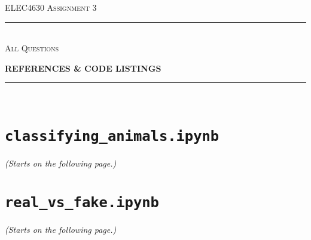 \begin{titlepage}
  \centering

  \textsc{ELEC4630 Assignment 3}\\
  \vspace{9cm}

  \rule{\linewidth}{0.5pt}\\

  \vspace{1em}
  \LARGE\textsc{All Questions}\\
  \vspace{1em}

  \LARGE\uppercase{\textbf{{References \& Code Listings}}}\\

  \rule{\linewidth}{2pt}\\

  \vfill

\end{titlepage}

\printbibliography

\newpage
\appendix

\section{\texttt{classifying\_animals.ipynb}} \label{app:classifying_animals_ipynb}
\textit{(Starts on the following page.)}


\section{\texttt{real\_vs\_fake.ipynb}} \label{app:real_vs_fake_ipynb}
\textit{(Starts on the following page.)}

